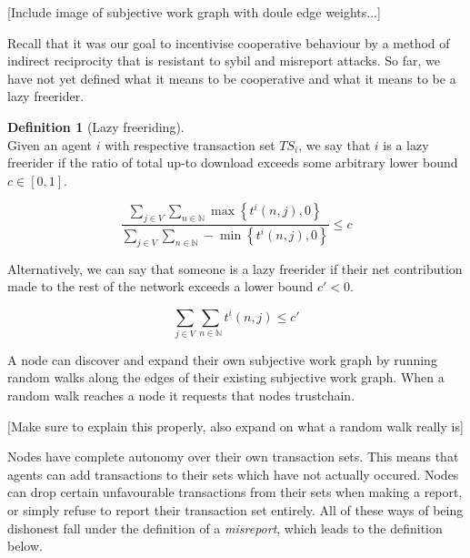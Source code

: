 \documentclass[11pt,a4paper]{article}
\theoremstyle{definition}
\newtheorem{definition}{Definition}[section]
\theoremstyle{theorem}
\theoremstyle{proposition}
\theoremstyle{corollary}
\theoremstyle{lemma}
\theoremstyle{example}
\theoremstyle{remark}
\begin{document}
\noindent{}\begin{center} [Include image of subjective work graph with doule edge weights...] \vspace{1em}\\ \end{center}

\noindent{}Recall that it was our goal to incentivise cooperative behaviour by a method of indirect reciprocity that is resistant to sybil and misreport attacks. So far, we have not yet defined what it means to be cooperative and what it means to be a lazy freerider.\vspace{1em}\\

\begin{definition}[Lazy freeriding]\ \\
Given an agent $i$ with respective transaction set $TS_i$, we say that $i$ is a lazy freerider if the ratio of total up-to download exceeds some arbitrary lower bound $c\in{}[0,1]$. 

\[
\frac{\sum\limits_{j\in{}V}\sum\limits_{n\in\mathbb{N}}\max\left\lbrace{}t^i(n,j), 0\right\rbrace}{\sum\limits_{j\in{}V}\sum\limits_{n\in\mathbb{N}}-\min\left\lbrace{}t^i(n,j), 0\right\rbrace}\leq{}c
\]

\noindent{}Alternatively, we can say that someone is a lazy freerider if their net contribution made to the rest of the network exceeds a lower bound $c' < 0$.

\[
\sum\limits_{j\in{}V}\sum\limits_{n\in\mathbb{N}}t^i(n,j)\leq{}c' 
\]
\end{definition}

\noindent{}A node can discover and expand their own subjective work graph by running random walks along the edges of their existing subjective work graph. When a random walk reaches a node it requests that nodes trustchain. \vspace{1em}\\

\noindent{} \begin{center} [Make sure to explain this properly, also expand on what a random walk really is] \vspace{1em}\\ \end{center}
\noindent{}Nodes have complete autonomy over their own transaction sets. This means that agents can add transactions to their sets which have not actually occured. Nodes can drop certain unfavourable transactions from their sets when making a report, or simply refuse to report their transaction set entirely. All of these ways of being dishonest fall under the definition of a {\it misreport}, which leads to the definition below.
\end{document}
